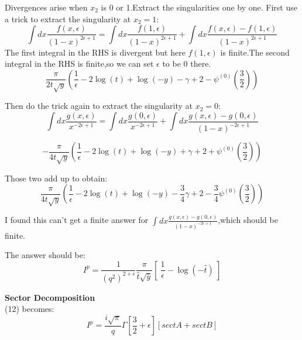 \documentclass{article}
\begin{document}
Divergences arise when $x_2$ is 0 or 1.Extract the singularities one by one. First use a trick to extract the singularity at $x_2=1$:\\
\begin{equation*}
\int dx\frac{f(x,\epsilon )}{(1-x)^{2\epsilon +1}}=\int dx\frac{f(1,\epsilon )}{(1-x)^{2\epsilon +1}}+\int dx\frac{f(x,\epsilon )-f(1,\epsilon )}{(1-x)^{2\epsilon +1}}
\end{equation*}
The first integral in the RHS is divergent but here $f(1,\epsilon )$ is finite.The second integral in the RHS is finite,so we can set $\epsilon$ to be 0 there.\\

\begin{equation}
\frac{\pi  }{2 t \sqrt{y}}\left(\frac{1}{\epsilon }-2 \log (t)+\log (-y)-\gamma +2-\psi ^{(0)}\left(\frac{3}{2}\right)\right)
\end{equation}

Then do the trick again to extract the singularity at $x_2=0$:\\
\begin{equation*}
\int dx\frac{g(x,\epsilon )}{x^{-2\epsilon +1}}=\int dx\frac{g(0,\epsilon )}{x^{-2\epsilon +1}}+\int dx\frac{g(x,\epsilon )-g(0,\epsilon )}{(1-x)^{-2\epsilon +1}}
\end{equation*}

\begin{equation}
-\frac{\pi  }{4 t \sqrt{y}}\left(\frac{1}{\epsilon }-2 \log (t)+\log (-y)+\gamma +2+\psi ^{(0)}\left(\frac{3}{2}\right)\right)
\end{equation}

Those two add up to obtain:\\
\begin{equation}
\frac{\pi  }{4 t \sqrt{y}}\left(\frac{1}{\epsilon }-2 \log (t)+\log (-y)-\frac{3}{4}\gamma +2-\frac{3}{4}\psi ^{(0)}\left(\frac{3}{2}\right)\right)
\end{equation}

I found this can't get a finite answer for $\displaystyle\int dx\frac{g(x,\epsilon )-g(0,\epsilon )}{(1-x)^{-2\epsilon +1}}$,which should be finite.

The answer should be:\\
\begin{equation}
I^p=\frac{1}{(q^2)^{2+\epsilon}}\frac{\pi}{\hat{t}\sqrt{\hat{y}}}[~\frac{1}{\epsilon}-\log(-\hat{t})~]
\end{equation}


\textbf{Sector Decomposition}\\
(12) becomes:\\
\begin{equation}
I^p=\frac{i\sqrt{\pi}}{q}\Gamma[\frac{3}{2}+\epsilon][sectA+sectB]
\end{equation}
\end{document}
